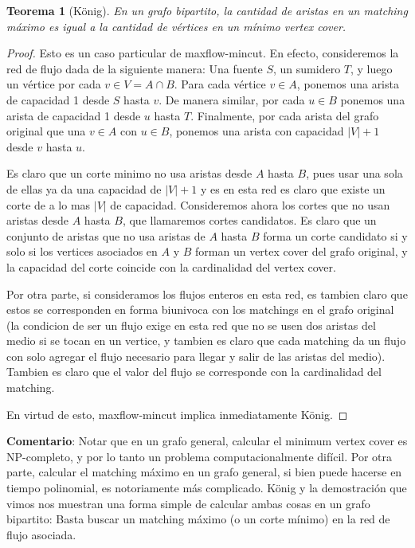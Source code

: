 \documentclass{article}
\newtheorem{teorema}{{\sc Teorema}}
\begin{document}
\begin{teorema}[König]
En un grafo bipartito, la cantidad de aristas en un matching máximo es igual a la cantidad de vértices en un mínimo vertex cover.
\end{teorema}
\begin{proof}
Esto es un caso particular de maxflow-mincut. En efecto, consideremos la red de flujo dada de la siguiente manera: Una fuente $S$, un
sumidero $T$, y luego un vértice por cada $v \in V = A \cap B$. Para cada vértice $v \in A$, ponemos una arista de capacidad 1 desde
$S$ hasta $v$. De manera similar, por cada $u \in B$ ponemos una arista de capacidad 1 desde $u$ hasta $T$. Finalmente, por cada arista
del grafo original que una $v \in A$ con $u \in B$, ponemos una arista con capacidad $|V|+1$ desde $v$ hasta $u$.

Es claro que un corte minimo no usa aristas desde $A$ hasta $B$, pues usar una sola de ellas ya da una capacidad de $|V|+1$ y es en esta red
es claro que existe un corte de a lo mas $|V|$ de capacidad. Consideremos ahora los cortes que no usan aristas desde $A$ hasta $B$, que
llamaremos cortes candidatos. Es claro que un conjunto de aristas que no usa aristas de $A$ hasta $B$ forma un corte candidato si y solo si
los vertices asociados en $A$ y $B$ forman un vertex cover del grafo original, y la capacidad del corte coincide con la cardinalidad del vertex
cover.

Por otra parte, si consideramos los flujos enteros en esta red, es tambien claro que estos se corresponden en forma biunivoca con los matchings
en el grafo original (la condicion de ser un flujo exige en esta red que no se usen dos aristas del medio si se tocan en un vertice, y tambien
es claro que cada matching da un flujo con solo agregar el flujo necesario para llegar y salir de las aristas del medio). Tambien es claro
que el valor del flujo se corresponde con la cardinalidad del matching.

En virtud de esto, maxflow-mincut implica inmediatamente König.

\end{proof}

\textbf{Comentario}: Notar que en un grafo general, calcular el minimum vertex cover es NP-completo, y por lo tanto un problema computacionalmente difícil. Por otra
parte, calcular el matching máximo en un grafo general, si bien puede hacerse en tiempo polinomial, es notoriamente más complicado. König y
la demostración que vimos nos muestran una forma simple de calcular ambas cosas en un grafo bipartito: Basta buscar un matching máximo (o un corte
mínimo) en la red de flujo asociada.
\end{document}
